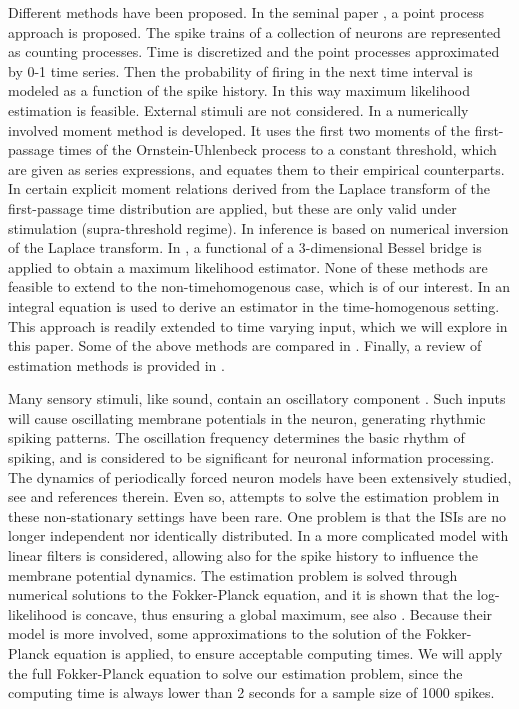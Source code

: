 Different methods have been
proposed. In the seminal paper \cite{Brillinger1988}, a point process approach
is proposed. The spike trains of a collection of neurons are 
represented as counting processes. Time is discretized and the point processes
approximated by 0-1 time series. Then the probability of firing in the
next time interval is modeled as a function of the
spike history. In this way maximum likelihood
estimation is feasible. External stimuli are not considered. 
In \cite{Inoue1995} a numerically involved moment method is
developed. It uses the first two moments of the first-passage times of
the Ornstein-Uhlenbeck process to a constant threshold, which are
given as series expressions, and equates them to their empirical
counterparts. In
\cite{DitlevsenLansky2005,DitlevsenLansky2006} certain explicit 
moment relations derived from the Laplace transform of the first-passage time
distribution are applied, but these are only valid under 
stimulation (supra-threshold regime). In \cite{Mullowney2008} inference is based on
numerical inversion of the Laplace transform. In \cite{Zhangetal2009}, a
functional of a 3-dimensional Bessel bridge is applied to obtain a maximum
likelihood estimator. None of these methods
are feasible to extend to the
non-timehomogenous case, which is of our interest. In \cite{Ditlevsen2008,Ditlevsen2007} an
integral equation is used to derive an estimator in the
time-homogenous setting. This approach is readily extended to time
varying input, which we will explore in this paper. Some of the above methods are compared in
\cite{Ditlevsen2008a}. Finally, a review of estimation methods is provided in
\cite{Lansky2008}. 

Many sensory stimuli, like sound, contain an oscillatory component
\cite{Braunetal1994,Chacron2000}. Such inputs will cause oscillating membrane
potentials in the neuron, generating rhythmic spiking patterns. The oscillation
frequency determines the basic rhythm of spiking, and is considered to be
significant for neuronal information processing. The dynamics of periodically
forced neuron models have been extensively studied, see
\cite{Bulsaraetal1996,Burkitt2006b,Lansky1997,Longtingetal1994,SacerdoteGiraudo2013,Shimokawa2000}
and references therein. Even so, attempts to solve the estimation problem in
these non-stationary settings have been rare. One problem is that the ISIs are
no longer independent nor identically distributed. In
\cite{Paninski2004} a more complicated model with linear filters is considered, allowing
also for the spike history to influence the membrane potential
dynamics. The estimation problem is solved through numerical solutions to the
Fokker-Planck equation, and it is shown that the log-likelihood is
concave, thus ensuring a global maximum, see also
\cite{Dong2011,Sirovich2011a}. Because their model is more involved,
some approximations to the solution of the Fokker-Planck equation is
applied, to ensure acceptable computing times. We will apply the full 
Fokker-Planck equation to solve our estimation problem, since the
computing time is always lower than 2 seconds for a sample size of
1000 spikes.   
  


